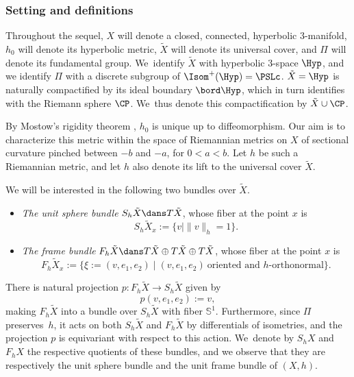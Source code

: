 \subsubsection{Setting and definitions}\label{ss.as_Plateau_definitions} Throughout the sequel, $X$ will denote a closed, connected, hyperbolic $3$\nobreakdash-manifold, $h_0$ will denote its hyperbolic metric, $\tilde{X}$ will denote its universal cover, and $\Pi$ will denote its fundamental group. We~identify $\tilde{X}$ with hyperbolic $3$\nobreakdash-space $\Hyp$, and we identify $\Pi$ with a discrete subgroup of $\Isom^+(\Hyp)=\PSLc$. $\tilde{X}=\Hyp$ is naturally compactified by its ideal boundary $\bord\Hyp$, which in turn identifies with the Riemann sphere $\CP$. We~thus denote this compactification by $\tilde{X}\cup\CP$.

By Mostow's rigidity theorem \cite{Mostow}, $h_0$ is unique up to diffeomorphism. Our aim is to characterize this metric within the space of Riemannian metrics on $X$ of sectional curvature pinched between $-b$ and $-a$, for $0<a<b$. Let $h$ be such a Riemannian metric, and let $h$ also denote its lift to the universal cover $\tilde{X}$.

We will be interested in the following two bundles over $\tilde{X}$.
\begin{itemize}
\item \emph{The unit sphere bundle} $S_h\tilde{X}\dans T\tilde{X}$, whose fiber at the point $x$ is
\begin{equation*}
S_h\tilde{X}_x:=\{v\mid \|v\|_h=1\}.
\end{equation*}
\item \emph{The frame bundle} $F_h\tilde{X}\dans T\tilde{X}\oplus T\tilde{X}\oplus T\tilde{X}$, whose fiber at the point $x$ is
\begin{equation*}
F_h\tilde{X}_x:=\{\xi:=(v,e_1,e_2)\mid (v,e_1,e_2)\ \text{oriented and $h$-orthonormal}\}.
\end{equation*}
\end{itemize}
There is natural projection $p:F_h\tilde{X}\to S_h\tilde{X}$ given by
\begin{equation*}
p(v,e_1,e_2):=v,
\end{equation*}
making $F_h\tilde{X}$ into a bundle over $S_h\tilde{X}$ with fiber $\mathbb{S}^1$. Furthermore, since $\Pi$ preserves~$h$, it acts on both $S_h\tilde{X}$ and $F_h\tilde{X}$ by differentials of isometries, and the projection $p$ is equivariant with respect to this action. We~denote by $S_hX$ and $F_hX$ the respective quotients of these bundles, and we observe that they are respectively the unit sphere bundle and the unit frame bundle of $(X,h)$.

